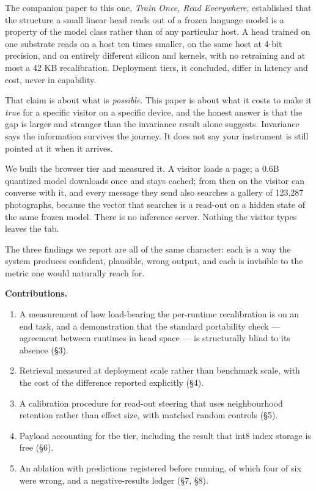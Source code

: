 \documentclass[
  11pt,
]{article}
\providecommand{\tightlist}{%
  \setlength{\itemsep}{0pt}\setlength{\parskip}{0pt}}
\begin{document}
The companion paper to this one, \emph{Train Once, Read Everywhere},
established that the structure a small linear head reads out of a frozen
language model is a property of the model class rather than of any
particular host. A head trained on one substrate reads on a host ten
times smaller, on the same host at 4-bit precision, and on entirely
different silicon and kernels, with no retraining and at most a 42 KB
recalibration. Deployment tiers, it concluded, differ in latency and
cost, never in capability.

That claim is about what is \emph{possible}. This paper is about what it
costs to make it \emph{true} for a specific visitor on a specific
device, and the honest answer is that the gap is larger and stranger
than the invariance result alone suggests. Invariance says the
information survives the journey. It does not say your instrument is
still pointed at it when it arrives.

We built the browser tier and measured it. A visitor loads a page; a
0.6B quantized model downloads once and stays cached; from then on the
visitor can converse with it, and every message they send also searches
a gallery of 123,287 photographs, because the vector that searches is a
read-out on a hidden state of the same frozen model. There is no
inference server. Nothing the visitor types leaves the tab.

The three findings we report are all of the same character: each is a
way the system produces confident, plausible, wrong output, and each is
invisible to the metric one would naturally reach for.

\textbf{Contributions.}

\begin{enumerate}
\def\labelenumi{\arabic{enumi}.}
\tightlist
\item
  A measurement of how load-bearing the per-runtime recalibration is on
  an end task, and a demonstration that the standard portability check
  --- agreement between runtimes in head space --- is structurally blind
  to its absence (§3).
\item
  Retrieval measured at deployment scale rather than benchmark scale,
  with the cost of the difference reported explicitly (§4).
\item
  A calibration procedure for read-out steering that uses neighbourhood
  retention rather than effect size, with matched random controls (§5).
\item
  Payload accounting for the tier, including the result that int8 index
  storage is free (§6).
\item
  An ablation with predictions registered before running, of which four
  of six were wrong, and a negative-results ledger (§7, §8).
\end{enumerate}
\end{document}
